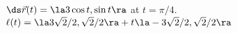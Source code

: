 {$\ds \vec r(t) = \la 3\cos t,\sin t\ra$ at $t=\pi/4$.
}
{
$\ell(t) = \la 3\sqrt{2}/2,\sqrt{2}/2\ra + t\la-3\sqrt{2}/2,\sqrt{2}/2\ra$
}

